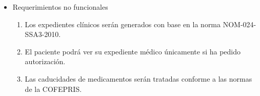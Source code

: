 \documentclass[12pt,letterpaper]{article}
\begin{document}
{{{\begin{itemize}
\begin{enumerate}
                        \item El usuario administrador podrá generar de reportes estadísticos.
                        \item El sistema contará con manejo de almacén de farmacia.
                        \item Los médicos podrán consultar la disponibilidad de medicamentos en farmacia.
                        \item El encargado de farmacia podrá consultar la disponibilidad de medicamentos.
                        \item El sistema generará una advertencia para los usuarios encargados de farmacia cuando un medicamento esté pronto a caducar.
                        \item Los médicos podrían generar recetas físicas o electrónicas.
                        \item Cada consulta se llevará un registro de el personal que atendió al paciente.
                        \item El sistema permitirá agendar citas a usuarios sin registro.
                        \item El sistema enviará correos electrónicos de verificación, mediante tokens, para las citas.
                        \item El usuario recepcionista podrá consultar la agenda de cada médico titular.
                        \item El usuario recepcionista podrá ver las citas de todos los usuarios.
                        \item El usuario recepcionista podrá realizar cobros de consultas.
                        \item El encargado de farmacia podrá realizar cobros por medicamentos.
                        \item El encargado de farmacia podrá modificar la existencia de medicamentos en inventario.
                    \end{enumerate}
                    \item Requerimientos no funcionales
                    \begin{enumerate}
                        \item Los expedientes clínicos serán generados con base en la norma NOM-024-SSA3-2010.
                        \item El paciente podrá ver su expediente médico únicamente si ha pedido autorización.
                        \item Las caducidades de medicamentos serán tratadas conforme a las normas de la COFEPRIS.

\end{enumerate}
\end{itemize}}}}
\end{document}

